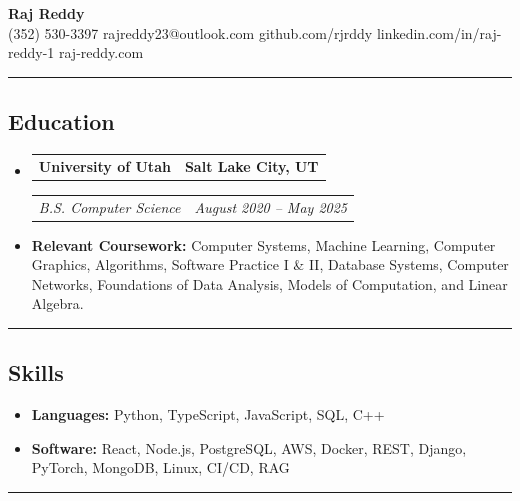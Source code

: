 \documentclass[11pt,letterpaper]{article}
\makeatletter
\newcommand{\headerrow}[2]
{\begin{tabular*}{\linewidth}{l@{\extracolsep{\fill}}r}
#1 &
#2 \\
\end{tabular*}}
\makeatother
\begin{document}
\begin{center}
	{\LARGE \textbf{Raj Reddy}}\\
	\vspace{0.05cm}
	(352) 530-3397
    \hfill rajreddy23@outlook.com
    \hfill github.com/rjrddy
    \hfill linkedin.com/in/raj-reddy-1
    \hfill raj-reddy.com
\end{center}
\hrule
\vspace{-1em}
\subsection*{\Large Education}
\renewcommand\labelitemi{}
\begin{itemize}[leftmargin=1em]
	\parskip=0.1em
	\item
	      \headerrow
	      {\textbf{University of Utah}}
	      {\textbf{Salt Lake City, UT}}
	      \headerrow
	      {\emph{B.S. Computer Science}}
	      {\emph{August 2020 -- May 2025}}
	      \item \textbf{Relevant Coursework:} Computer Systems, Machine Learning, Computer Graphics, Algorithms, Software Practice I \& II, Database Systems, Computer Networks, Foundations of Data Analysis, Models of Computation, and Linear Algebra.
\end{itemize}
\hrule
\vspace{-1em}
\subsection*{\Large Skills}
\begin{itemize}[leftmargin=1em]
    \parskip=0.1em
	\item \textbf{Languages:} Python, TypeScript, JavaScript, SQL, C++
	\item \textbf{Software:} React, Node.js, PostgreSQL, AWS, Docker, REST, Django, PyTorch, MongoDB, Linux, CI/CD, RAG
\end{itemize}
\hrule
\vspace{-1em}
\end{document}
